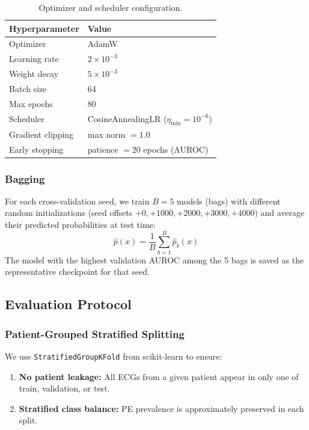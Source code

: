 \documentclass[11pt,a4paper]{article}
\begin{document}
\begin{table}[H]
\centering
\caption{Optimizer and scheduler configuration.}
\label{tab:optimizer}
\begin{tabular}{ll}
\toprule
\textbf{Hyperparameter} & \textbf{Value} \\
\midrule
Optimizer & AdamW \\
Learning rate & $2 \times 10^{-3}$ \\
Weight decay & $5 \times 10^{-3}$ \\
Batch size & 64 \\
Max epochs & 80 \\
Scheduler & CosineAnnealingLR ($\eta_{\min} = 10^{-6}$) \\
Gradient clipping & max norm $= 1.0$ \\
Early stopping & patience $= 20$ epochs (AUROC) \\
\bottomrule
\end{tabular}
\end{table}

\subsubsection{Bagging}

For each cross-validation seed, we train $B{=}5$ models (bags) with different random initializations (seed offsets $+0, +1000, +2000, +3000, +4000$) and average their predicted probabilities at test time:
\begin{equation}
\hat{p}(x) = \frac{1}{B} \sum_{b=1}^{B} \hat{p}_b(x)
\end{equation}
The model with the highest validation AUROC among the 5 bags is saved as the representative checkpoint for that seed.


\subsection{Evaluation Protocol}
\label{sec:eval}

\subsubsection{Patient-Grouped Stratified Splitting}

We use \texttt{StratifiedGroupKFold} from scikit-learn to ensure:
\begin{enumerate}[nosep]
  \item \textbf{No patient leakage:} All ECGs from a given patient appear in only one of train, validation, or test.
  \item \textbf{Stratified class balance:} PE prevalence is approximately preserved in each split.
\end{enumerate}
\end{document}

